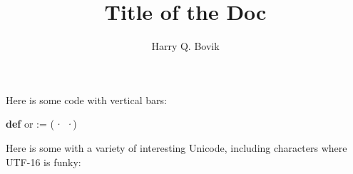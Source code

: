 \documentclass[oneside]{memoir}
\title{\sffamily Title of the Doc}
\author{\sffamily Harry Q. Bovik}
\date{\sffamily }
\begin{document}
\frontmatter

\begin{titlingpage}
\maketitle
\end{titlingpage}

\tableofcontents


\cleardoublepage
Here is some code with vertical bars:


\begin{LeanVerbatim}
\textbf{def} or := (\textit{·}  \textit{·})

\end{LeanVerbatim}



Here is some with a variety of interesting Unicode, including characters where UTF-16 is funky:
\end{document}
